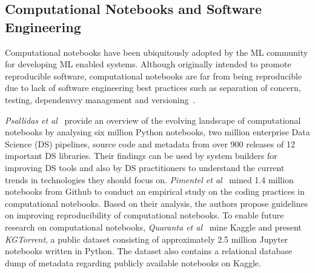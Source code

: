 
\subsection{Computational Notebooks and Software Engineering}\label{sec:notebooks}




Computational notebooks have been ubiquitously adopted by the ML community for developing ML enabled systems. Although originally intended to promote reproducible software, computational notebooks are far from being reproducible due to lack of software engineering best practices such as separation of concern, testing, dependenvcy management and versioning~\cite{pimentel2019large-scale,wang2020better,chattopadhyay2020whats}.

\emph{Psallidas et al}~\cite{psallidas2019data} provide an overview of the evolving landscape of computational notebooks by analysing six million Python notebooks, two million enterprise Data Science (DS) pipelines, source code and metadata from over 900 releases of 12 important DS libraries. Their findings can be used by system builders for improving DS tools and also by DS practitioners to understand the current trends in technologies they should focus on. \emph{Pimentel et al}~\cite{pimentel2019large-scale} mined 1.4 million notebooks from Github to conduct an empirical study on the coding practices in computational notebooks. Based on their analysis, the authors propose guidelines on improving reproducibility of computational notebooks. To enable future research on computational notebooks, \emph{Quaranta et al}~\cite{quaranta2021kgtorrent} mine Kaggle and present \textit{KGTorrent}, a public dataset consisting of approximately 2.5 million Jupyter notebooks written in Python. The dataset also contains a relational database dump of metadata regarding publicly available notebooks on Kaggle.

